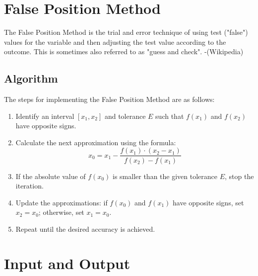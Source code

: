 \documentclass[12pt]{article}
\begin{document}
\newpage
\section*{False Position Method}

The False Position Method is the trial and error technique of using test ("false") values for the variable and then adjusting the test value according to the outcome. This is sometimes also referred to as "guess and check". -(Wikipedia)

\subsection*{Algorithm}
The steps for implementing the False Position Method are as follows:

\begin{enumerate}
    \item Identify an interval \([x_1, x_2]\) and tolerance \(E\) such that \(f(x_1)\) and \(f(x_2)\) have opposite signs.
    
    \item Calculate the next approximation using the formula:
    \[
        x_0 = x_1 - \frac{f(x_1) \cdot (x_2 - x_1)}{f(x_2) - f(x_1)}
    \]
    \item If the absolute value of \(f(x_0)\) is smaller than the given tolerance \(E\), stop the iteration.
    \item Update the approximations: if \(f(x_0)\) and \(f(x_1)\) have opposite signs, set \(x_2 = x_0\); otherwise, set \(x_1 = x_0\).
    \item Repeat until the desired accuracy is achieved.
    \end{enumerate}
    
    
    \section*{Input and Output}
    
\end{document}
